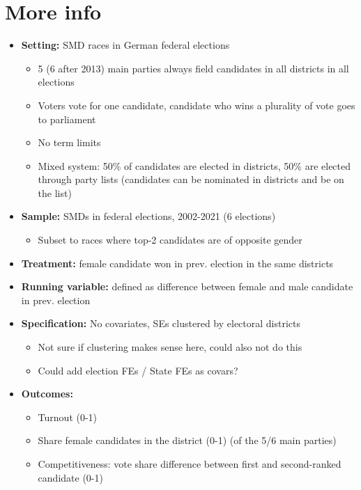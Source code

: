 \documentclass[
  letterpaper,
  DIV=11,
  numbers=noendperiod]{scrartcl}
\providecommand{\tightlist}{%
  \setlength{\itemsep}{0pt}\setlength{\parskip}{0pt}}\usepackage{longtable,booktabs,array}
\begin{document}
\hypertarget{more-info}{%
\section{More info}\label{more-info}}

\begin{itemize}
\tightlist
\item
  \textbf{Setting:} SMD races in German federal elections

  \begin{itemize}
  \tightlist
  \item
    5 (6 after 2013) main parties always field candidates in all
    districts in all elections
  \item
    Voters vote for one candidate, candidate who wins a plurality of
    vote goes to parliament
  \item
    No term limits
  \item
    Mixed system: 50\% of candidates are elected in districts, 50\% are
    elected through party lists (candidates can be nominated in
    districts and be on the list)
  \end{itemize}
\item
  \textbf{Sample:} SMDs in federal elections, 2002-2021 (6 elections)

  \begin{itemize}
  \tightlist
  \item
    Subset to races where top-2 candidates are of opposite gender
  \end{itemize}
\item
  \textbf{Treatment:} female candidate won in prev. election in the same
  districts
\item
  \textbf{Running variable:} defined as difference between female and
  male candidate in prev. election
\item
  \textbf{Specification:} No covariates, SEs clustered by electoral
  districts

  \begin{itemize}
  \tightlist
  \item
    Not sure if clustering makes sense here, could also not do this
  \item
    Could add election FEs / State FEs as covars?
  \end{itemize}
\item
  \textbf{Outcomes:}

  \begin{itemize}
  \tightlist
  \item
    Turnout (0-1)
  \item
    Share female candidates in the district (0-1) (of the 5/6 main
    parties)
  \item
    Competitiveness: vote share difference between first and
    second-ranked candidate (0-1)


\end{itemize}
\end{itemize}
\end{document}

